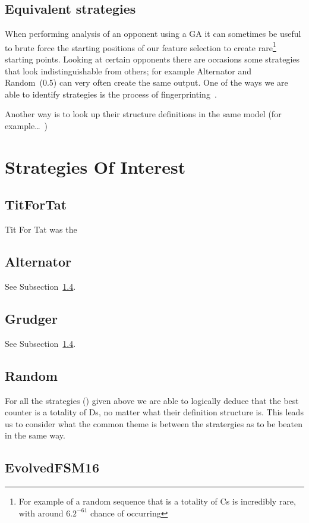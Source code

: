 \subsection{Equivalent strategies}\label{subsec:equivalentStrategies}
When performing analysis of an opponent using a GA it can sometimes be useful to brute force the starting positions of our feature selection to create rare\footnote{For example of a random sequence that is a totality of Cs is incredibly rare, with around \(6.2^{-61}\) chance of occurring} starting points.
Looking at certain opponents there are occasions some strategies that look indistinguishable from others;
for example Alternator and Random~(0.5) can very often create the same output.
One of the ways we are able to identify strategies is the process of fingerprinting~\cite{Ashlock2004,Ashlock2008}.

Another way is to look up their structure definitions in the same model (for example\ldots~)

\section{Strategies Of Interest}\label{sec:strategiesOfInterest}
\subsection{TitForTat}\label{subsec:titfortat}
Tit For Tat was the
\subsection{Alternator}\label{subsec:alternator}
See Subsection~\ref{subsec:random}.
\subsection{Grudger}\label{subsec:grudger}
See Subsection~\ref{subsec:random}.
\subsection{Random}\label{subsec:random}

For all the strategies () given above we are able to logically deduce that the best counter is a totality of Ds, no matter what their definition structure is.
This leads us to consider what the common theme is between the stratergies as to be beaten in the same way.



\subsection{EvolvedFSM16}\label{subsec:evolvedFSM16}
